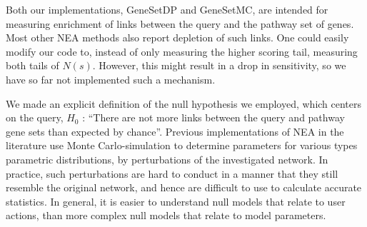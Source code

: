 \documentclass[a4paper,american]{lipics-v2016}
\begin{document}
Both our implementations, GeneSetDP and GeneSetMC, are intended for measuring enrichment of links between the query and the pathway set of genes. Most other NEA methods also report depletion of such links. One could easily modify our code to, instead of only measuring the higher scoring tail, measuring both tails of $N(s)$. However, this might result in a drop in sensitivity, so we have so far not implemented such a mechanism.

We made an explicit definition of the null hypothesis we employed, which centers on the query, $H_0$ : ``There are not more links between the query and pathway gene sets than expected by chance''. Previous implementations of NEA in the literature use Monte Carlo-simulation to determine parameters for various types parametric distributions, by perturbations of the investigated network. In practice, such perturbations are hard to conduct in a manner that they still resemble the original network, and hence are difficult to use to calculate accurate statistics. In general, it is easier to understand null models that relate to user actions, than more complex null models that relate to model parameters.


\end{document}

